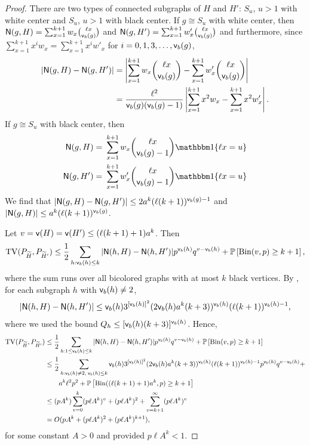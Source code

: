 \begin{proof}
There are two types of connected subgraphs of $ H $ and $ H' $: $ S_u $, $u > 1$ with white center and $ S_u $, $u > 1$ with black center. If $ g \cong S_u $ with white center, then $ {\mathsf{N}}(g, H) = \sum_{x=1}^{k+1}w_x\binom{\ell x}{{\mathsf{v}}_b(g)} $ and $ {\mathsf{N}}(g, H') = \sum_{x=1}^{k+1} w'_x\binom{\ell x}{{\mathsf{v}}_b(g)} $ and furthermore, since $ \sum_{x=1}^{k+1}x^iw_x = \sum_{x=1}^{k+1}x^iw'_x $ for $ i = 0, 1, 3, \dots, {\mathsf{v}}_b(g) $,
\begin{align*}
|{\mathsf{N}}(g, H) - {\mathsf{N}}(g, H')| & = \left|\sum_{x=1}^{k+1}w_x \binom{\ell x}{{\mathsf{v}}_b(g)} - \sum_{x=1}^{k+1}w'_x \binom{\ell x}{{\mathsf{v}}_b(g)}\right|  \\
& = \frac{\ell^2}{{\mathsf{v}}_b(g)({\mathsf{v}}_b(g)-1)}\left|\sum_{x=1}^{k+1}x^2w_x - \sum_{x=1}^{k+1}x^2w'_x\right|.
\end{align*}
If $ g \cong S_u $ with black center, then 
\begin{align*}
\N(g, H) = & ~  \sum_{x=1}^{k+1}w_x\binom{\ell x}{\sfv_b(g)-1}\Indc\{ \ell x = u \}\\
\N(g, H')= & ~ 	\sum_{x=1}^{k+1} w'_x\binom{\ell x}{\sfv_b(g)-1}\Indc\{ \ell x = u \}
\end{align*}
 We find that $ |{\mathsf{N}}(g, H)-{\mathsf{N}}(g, H')| \leq 2a^k(\ell(k+1))^{{\mathsf{v}}_b(g)-1} $ and $ |{\mathsf{N}}(g, H)| \leq a^k(\ell(k+1))^{{\mathsf{v}}_b(g)} $. 

Let $ v = {\mathsf{v}}(H) = {\mathsf{v}}(H') \leq (\ell(k+1)+1)a^k $. Then
\begin{align*}
{\rm TV}(P_{{\widetilde{H}}}, P_{{\widetilde{H}}'}) \leq \frac{1}{2}\sum_{h:{\mathsf{v}}_{b}(h)\leq k}| {\mathsf{N}}(h, H) - {\mathsf{N}}(h, H')|p^{{\mathsf{v}}_{b}(h)}q^{v-{\mathsf{v}}_{b}(h)} + \mathbb{P}\left[\mathrm{Bin}(v, p) \geq k+1\right],
\end{align*}
where the sum runs over all bicolored graphs with at most $ k $ black vertices. By , for each subgraph $ h $ with $ {\mathsf{v}}_{b}(h) \neq 2 $,
\begin{equation*}
|{\mathsf{N}}(h, H)-{\mathsf{N}}(h, H')|  \leq {\mathsf{v}}_{b}(h)3^{[{\mathsf{v}}_{b}(h)]^2}(2{\mathsf{v}}_{b}(h)a^k(k+3))^{{\mathsf{v}}_{b}(h)}(\ell(k+1))^{{\mathsf{v}}_{b}(h)-1},
\end{equation*}
where we used the bound $ Q_h \leq [{\mathsf{v}}_{b}(h)(k+3)]^{{\mathsf{v}}_{b}(h)} $.
Hence,
\begin{align*}
{\rm TV}(P_{{\widetilde{H}}}, P_{{\widetilde{H}}'}) & \leq \frac{1}{2}\sum_{h:1 \leq {\mathsf{v}}_{b}(h)\leq k}| {\mathsf{N}}(h, H) - {\mathsf{N}}(h, H')|p^{{\mathsf{v}}_{b}(h)}q^{v-{\mathsf{v}}_{b}(h)} + \mathbb{P}\left[\mathrm{Bin}(v, p) \geq k+1\right] \\
& \leq \frac{1}{2}\sum_{h:{\mathsf{v}}_{b}(h)\neq 2,\; {\mathsf{v}}_{b}(h) \leq k}{\mathsf{v}}_{b}(h)3^{[{\mathsf{v}}_{b}(h)]^2}(2{\mathsf{v}}_{b}(h)a^k(k+3))^{{\mathsf{v}}_{b}(h)}(\ell(k+1))^{{\mathsf{v}}_{b}(h)-1}p^{{\mathsf{v}}_{b}(h)}q^{v-{\mathsf{v}}_{b}(h)}  + \\ & \qquad a^k\ell^2p^2 + \mathbb{P}\left[\mathrm{Bin}((\ell(k+1)+1)a^k, p) \geq k+1\right] \\
& \leq (pA^k) \sum_{v=0}^k (p\ell A^k)^{v} + (p\ell A^k)^2 + \sum_{v=k+1}^{\infty} (p\ell A^k)^{v} \\
& = O(pA^k  + (p\ell A^k)^2 + (p\ell A^k)^{k+1}),
\end{align*}
for some constant $ A > 0 $ and provided $ p\ell A^k < 1 $.
\end{proof}

